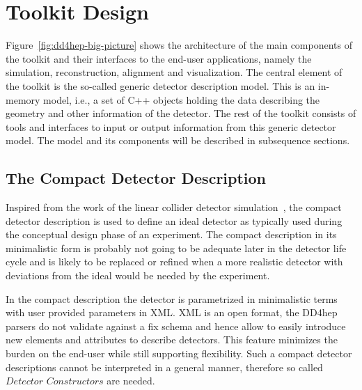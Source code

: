 \documentclass[a4paper]{jpconf}
\begin{document}
\section{Toolkit Design}
\label{sec:toolkit-design}
\noindent
Figure~\ref{fig:dd4hep-big-picture} shows the architecture 
of the main components of the toolkit and their interfaces 
to the end-user applications, namely the simulation, reconstruction, 
alignment and visualization. 
The central element of the toolkit is the so-called generic detector 
description model. This is an in-memory model, i.e., a set of C++ objects 
holding the data describing the geometry and other information of 
the detector. The rest of the toolkit consists of tools and interfaces 
to input or output information from this generic detector model. 
The model and its components will be described in subsequence sections.

\subsection{The Compact Detector Description}
\label{sec:problem_analysis}
\noindent
Inspired from the work of the linear collider detector 
simulation~\cite{bib:LCDD,bib:lcsim}, the compact detector description is used
to define an ideal detector as typically used during 
the conceptual design phase of an experiment. 
The compact description in its minimalistic form is probably not going to 
be adequate later in the detector life cycle and
is likely to be replaced or refined when a more realistic detector 
with deviations from the ideal would be needed by the experiment.

\noindent
In the compact description the detector is parametrized in minimalistic terms
with user provided parameters in XML.
XML is an open format, the DD4hep parsers do not validate against a fix schema
and hence allow to easily introduce new elements and attributes to describe 
detectors. This feature minimizes the burden on the end-user while still 
supporting flexibility.
Such a compact detector descriptions cannot be interpreted in a 
general manner, therefore so called $Detector$ $Constructors$ are needed.
\end{document}
